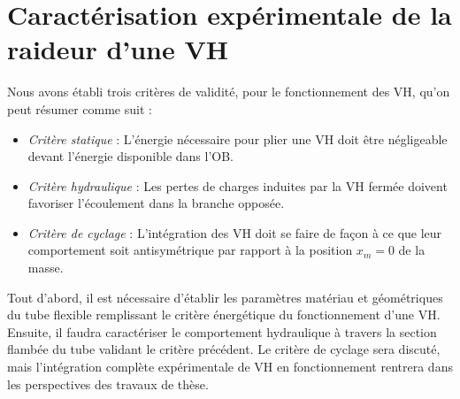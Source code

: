 \section{Caractérisation expérimentale de la raideur d'une VH}
\label{sec:4.2_Caracterisation experimentale de K_VH}
Nous avons établi trois critères de validité, pour le fonctionnement des VH, qu'on peut résumer comme suit :
\begin{itemize}[label=$\blacksquare$]
	\item \emph{Critère statique} : L'énergie nécessaire pour plier une VH doit être négligeable devant l'énergie disponible dans l'OB.
	\item \emph{Critère hydraulique} : Les pertes de charges induites par la VH fermée doivent favoriser l'écoulement dans la branche opposée.
	\item \emph{Critère de cyclage} : L'intégration des VH doit se faire de façon à ce que leur comportement soit antisymétrique par rapport à la position $x_m=0$ de la masse.
\end{itemize} 
Tout d'abord, il est nécessaire d'établir les paramètres matériau et géométriques du tube flexible remplissant le critère énergétique du fonctionnement d'une VH. Ensuite, il faudra caractériser le comportement hydraulique à travers la section flambée du tube validant le critère précédent. Le critère de cyclage sera discuté, mais l'intégration complète expérimentale de VH en fonctionnement rentrera dans les perspectives des travaux de thèse.
